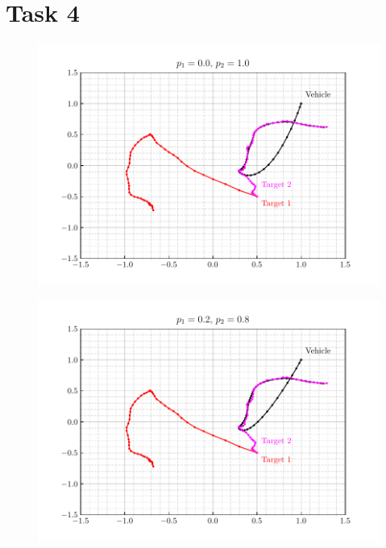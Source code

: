 \documentclass[12pt]{article}
\begin{document}
\section{Task 4}

\begin{figure}[H]
    \centering
    \includegraphics{../../src/task_4/output/ex_4_i=1.pdf}
\end{figure}

\begin{figure}[H]
    \centering
    \includegraphics{../../src/task_4/output/ex_4_i=2.pdf}
\end{figure}
\end{document}
